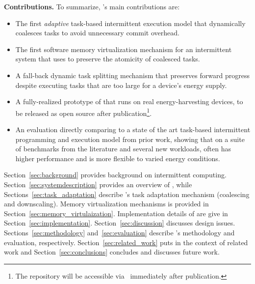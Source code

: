 \textbf{Contributions.} To summarize, \sys's main contributions are: 

\begin{itemize}
\item The first {\em adaptive} task-based intermittent execution model that dynamically coalesces tasks to avoid unnecessary commit overhead. 
\item The first software memory virtualization mechanism for an intermittent system that \sys uses to preserve the atomicity of coalesced tasks.
\item A fall-back dynamic task splitting mechanism that preserves forward progress despite executing tasks that are too large for a device's energy supply.
\item A fully-realized prototype of \sys that runs on real energy-harvesting devices, to be released as open source after publication\footnote{The \sys repository will be accessible via~\cite{coala_website} immediately after publication.}. 
\item An evaluation directly comparing \sys to a state of the art task-based intermittent programming and execution model from prior work, showing that on a suite of benchmarks from the literature and several new workloads, \sys often has higher performance and is more flexible to varied energy conditions. 
\end{itemize}

Section~\ref{sec:background} provides background on intermittent computing.
Section~\ref{sec:systemdescription} provides an overview of \sys, while
Sections~\ref{sec:task_adaptation} describe \sys's task adaptation mechanism (coalescing and downscaling). Memory virtualization mechanisms is provided in Section~\ref{sec:memory_virtulaization}. Implementation details of \sys are give in Section~\ref{sec:implementation}. Section~\ref{sec:discussion} discusses \sys
design issues. Sections~\ref{sec:methodology} and~\ref{sec:evaluation} describe
\sys's methodology and evaluation, respectively. Section~\ref{sec:related_work} puts \sys in the
context of related work and Section~\ref{sec:conclusions} concludes and discusses
future work.